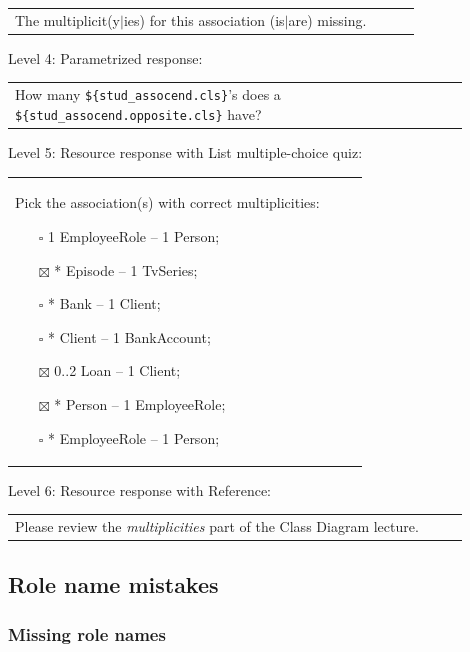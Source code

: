 \begin{tabular}{|p{0.9\linewidth}}
The multiplicit(y$|$ies) for this association (is$|$are) missing.
\end{tabular} \medskip

\noindent Level 4: Parametrized response: \medskip

\begin{tabular}{|p{0.9\linewidth}}
How many \verb|${stud_assocend.cls}|'s does a \verb|${stud_assocend.opposite.cls}| have?
\end{tabular} \medskip

\noindent Level 5: Resource response with List multiple-choice quiz: \medskip

\begin{tabular}{|p{0.9\linewidth}}

Pick the association(s) with correct multiplicities:

\begin{itemize}
    \item[$\square$] 1 EmployeeRole -- 1 Person;
    \item[$\boxtimes$] * Episode -- 1 TvSeries;
    \item[$\square$] * Bank -- 1 Client;
    \item[$\square$] * Client -- 1 BankAccount;
    \item[$\boxtimes$] 0..2 Loan -- 1 Client;
    \item[$\boxtimes$] * Person -- 1 EmployeeRole;
    \item[$\square$] * EmployeeRole -- 1 Person;
\end{itemize}

\end{tabular} \medskip

\noindent Level 6: Resource response with Reference: \medskip

\begin{tabular}{|p{0.9\linewidth}}
Please review the \textit{multiplicities} part of the Class Diagram lecture.
\end{tabular} \medskip


\subsection{Role name mistakes}

\subsubsection{Missing role names}

